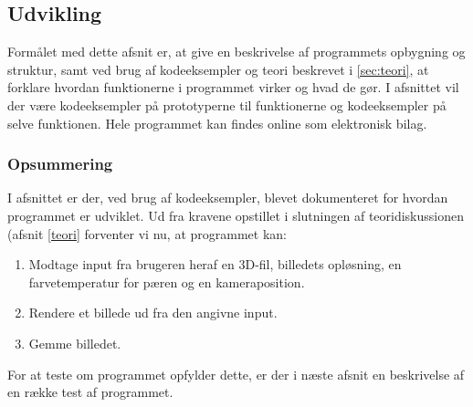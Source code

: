 \subsection{Udvikling}
Formålet med dette afsnit er, at give en beskrivelse af programmets opbygning og struktur, samt ved brug af kodeeksempler og teori beskrevet i \ref{sec:teori}, at forklare hvordan funktionerne i programmet virker og hvad de gør. I afsnittet vil der være kodeeksempler på prototyperne til funktionerne og kodeeksempler på selve funktionen. Hele programmet kan findes online som elektronisk bilag.







\subsubsection*{Opsummering}
\label{sec:krav_til_kode}
I afsnittet er der, ved brug af kodeeksempler, blevet dokumenteret for hvordan programmet er udviklet. Ud fra kravene opstillet i slutningen af teoridiskussionen (afsnit \ref{teori} forventer vi nu, at programmet kan:

\begin{enumerate}
    \item Modtage input fra brugeren heraf en 3D-fil, billedets opløsning, en farvetemperatur for pæren og en kameraposition.
    \item Rendere et billede ud fra den angivne input.
    \item Gemme billedet.
\end{enumerate}

For at teste om programmet opfylder dette, er der i næste afsnit en beskrivelse af en række test af programmet.